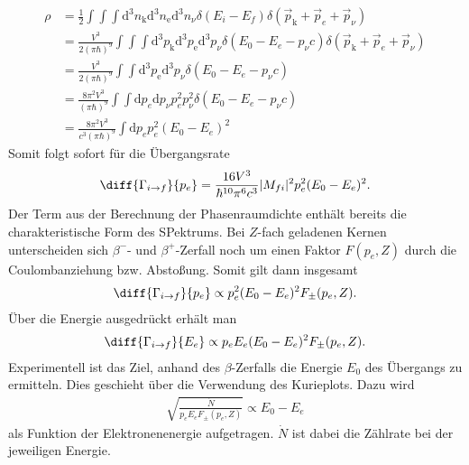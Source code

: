 \begin{align*}
  \rho&= \frac{1}{2}\int\int \int \mathrm{d}^3n_\mathrm{k} \mathrm{d}^3n_\mathrm{e}  \mathrm{d}^3n_\nu \delta (E_i-E_f) \delta (\vec{p}_\mathrm{k}+\vec{p}_e+\vec{p}_\nu)\\
  &=\frac{V^3}{2(\pi \hbar)^9} \int \int \int \mathrm{d}^3p_\mathrm{k}   \mathrm{d}^3p_\mathrm{e}  \mathrm{d}^3p_\nu\delta (E_0-E_e-p_\nu c) \delta (\vec{p}_\mathrm{k}+\vec{p}_e+\vec{p}_\nu)\\
  &=\frac{V^3}{2(\pi \hbar)^9}  \int \int  \mathrm{d}^3p_\mathrm{e} \mathrm{d}^3p_\nu \delta (E_0-E_e-p_\nu c)\\
  &= \frac{8 \pi^2 V^3}{(\pi \hbar)^9} \int \int \mathrm{d}p_e \mathrm{d}p_\nu p_e^2 p_\nu^2\delta (E_0-E_e-p_\nu c)\\
  &=\frac{8 \pi^2 V^3}{c^3 (\pi \hbar)^9} \int \mathrm{d}p_e p_e^2 (E_0-E_e)^2
\end{align*}
Somit folgt sofort für die Übergangsrate
\begin{align*}
  \diff{\Gamma_{i \rightarrow f}}{p_e}=\frac{16 V^3}{\hbar^{10} \pi^6 c^3}|M_{fi}|^2  p_e^2 (E_0-E_e)^2.
\end{align*}
Der Term aus der Berechnung der Phasenraumdichte enthält bereits die charakteristische Form des SPektrums. Bei $Z$-fach geladenen Kernen unterscheiden sich $\beta^-$- und $\beta^+$-Zerfall noch um einen Faktor $F(p_e,Z)$ durch die Coulombanziehung bzw. Abstoßung. Somit gilt dann insgesamt 
\begin{align*}
  \diff{\Gamma_{i \rightarrow f}}{p_e} \propto p_e^2(E_0-E_e)^2 F_\pm(p_e,Z).
\end{align*}
Über die Energie ausgedrückt erhält man
\begin{align*}
  \diff{\Gamma_{i \rightarrow f}}{E_e} \propto p_eE_e(E_0-E_e)^2 F_\pm(p_e,Z).
\end{align*}
Experimentell ist das Ziel, anhand des $\beta$-Zerfalls die Energie $E_0$ des Übergangs zu ermitteln. Dies geschieht über die Verwendung des Kurieplots. Dazu wird 
\begin{align*}
  \sqrt{\frac{\dot{N}}{p_eE_eF_\pm(p_e,Z)}} \propto E_0-E_e
\end{align*}
als Funktion der Elektronenenergie aufgetragen. $\dot{N}$ ist dabei die Zählrate bei der jeweiligen Energie.

